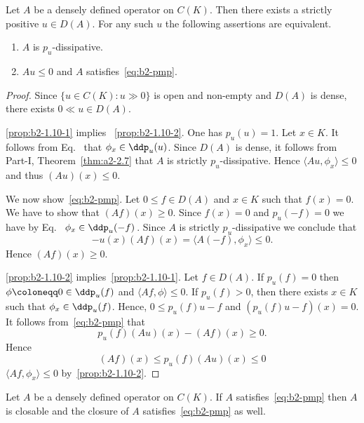 \begin{proposition}\label{prop:b2-1.10}
%
Let $A$ be a densely defined operator on $C(K)$.
Then there exists a strictly positive $u \in D(A)$.
For any such $u$ the following assertions are equivalent.
\begin{enumerate}[\upshape (a)]
\item  \label{prop:b2-1.10-1}
$A$ is $p_{u}$-dissipative.

\item  \label{prop:b2-1.10-2}
$Au \leq 0$ and $A$ satisfies~\eqref{eq:b2-pmp}.
\end{enumerate}
\end{proposition}
\begin{proof}
Since $\{u \in C(K) \colon u \gg 0\}$ is open and non-empty and $D(A)$ is dense, there exists $0 \ll u \in D(A)$.

\ref{prop:b2-1.10-1} implies ~\ref{prop:b2-1.10-2}.
One has $p_{u}(u) = 1$.
Let $x \in K$.
It follows from Eq.~ that $\phi_{x} \in \ddp_{u}(u)$.
Since $D(A)$ is dense, it follows from Part-I, Theorem~\ref{thm:a2-2.7}
that $A$ is strictly $p_{u}$-dissipative.
Hence $\langle Au,\phi_{x} \rangle \leq 0$ and thus $(Au)(x) \leq 0$.

We now show~\eqref{eq:b2-pmp}.
Let $0 \leq f \in D(A)$ and $x \in K$ such that $f(x) = 0$.
We have to show that $(Af)(x) \geq 0$.
Since $f(x) = 0$ and $p_{u}(-f) = 0$ we have by Eq.~  $\phi_{x} \in \ddp_{u}(-f)$\,.
Since $A$ is strictly $p_{u}$-dissipative we conclude that 
%
\[
	-u(x)(Af)(x) = \langle A(-f),\phi_{x} \rangle \leq 0.
\]
%
Hence $(Af)(x) \geq 0$.

\ref{prop:b2-1.10-2} implies~\ref{prop:b2-1.10-1}.
Let $f \in D(A)$.
If\/ $p_{u}(f) = 0$ then $\phi \coloneqq 0 \in \ddp_{u}(f)$ and $\langle Af,\phi \rangle \leq 0$.
If\/ $p_{u}(f) > 0$, then there exists $x \in K$ such that $\phi_{x} \in \ddp_{u}(f)$.
Hence, $0 \leq p_{u}(f)u - f$ and $(p_{u}(f)u - f)(x) = 0$.
It follows from~\eqref{eq:b2-pmp} that 
%
\[
	p_{u}(f)(Au)(x) - (Af)(x) \geq 0 .
\]
%
Hence 
%
\[
	 (Af)(x) \leq p_{u}(f)(Au)(x) \leq 0 
\]
%
\ie  $\langle Af,\phi_{x} \rangle \leq 0$ 
by~\ref{prop:b2-1.10-2}.
\end{proof}
\begin{corollary}\label{cor:b2-1.11}
Let $A$ be a densely defined operator on $C(K)$.
If\/ $A$ satisfies~\eqref{eq:b2-pmp} then $A$ is closable and the closure of\/ $A$ satisfies~\eqref{eq:b2-pmp} as well.
\end{corollary}
